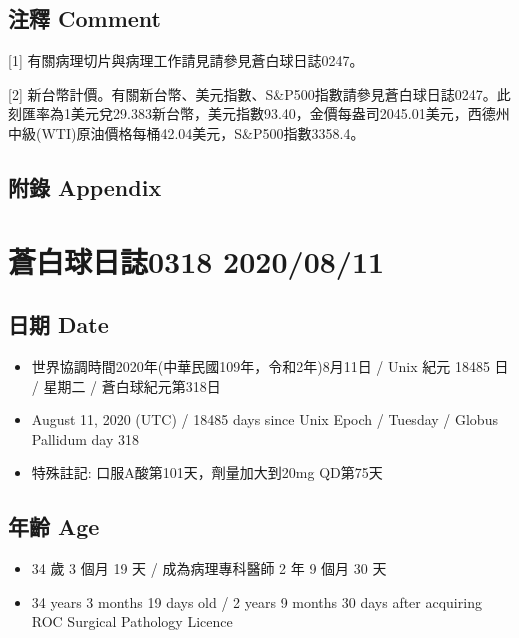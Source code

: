 \documentclass[
]{article}
\providecommand{\tightlist}{%
  \setlength{\itemsep}{0pt}\setlength{\parskip}{0pt}}
\begin{document}
\hypertarget{ux6ce8ux91cb-comment-9}{%
\subsection{注釋 Comment}\label{ux6ce8ux91cb-comment-9}}

{[}1{]} 有關病理切片與病理工作請見請參見蒼白球日誌0247。

{[}2{]}
新台幣計價。有關新台幣、美元指數、S\&P500指數請參見蒼白球日誌0247。此刻匯率為1美元兌29.383新台幣，美元指數93.40，金價每盎司2045.01美元，西德州中級(WTI)原油價格每桶42.04美元，S\&P500指數3358.4。

\hypertarget{ux9644ux9304-appendix-9}{%
\subsection{附錄 Appendix}\label{ux9644ux9304-appendix-9}}

\hypertarget{ux84bcux767dux7403ux65e5ux8a8c0318-20200811}{%
\section{蒼白球日誌0318
2020/08/11}\label{ux84bcux767dux7403ux65e5ux8a8c0318-20200811}}

\hypertarget{ux65e5ux671f-date-10}{%
\subsection{日期 Date}\label{ux65e5ux671f-date-10}}

\begin{itemize}
\tightlist
\item
  世界協調時間2020年(中華民國109年，令和2年)8月11日 / Unix 紀元 18485 日
  / 星期二 / 蒼白球紀元第318日
\item
  August 11, 2020 (UTC) / 18485 days since Unix Epoch / Tuesday / Globus
  Pallidum day 318
\item
  特殊註記: 口服A酸第101天，劑量加大到20mg QD第75天
\end{itemize}

\hypertarget{ux5e74ux9f61-age-10}{%
\subsection{年齡 Age}\label{ux5e74ux9f61-age-10}}

\begin{itemize}
\tightlist
\item
  34 歲 3 個月 19 天 / 成為病理專科醫師 2 年 9 個月 30 天
\item
  34 years 3 months 19 days old / 2 years 9 months 30 days after
  acquiring ROC Surgical Pathology Licence
\end{itemize}
\end{document}
